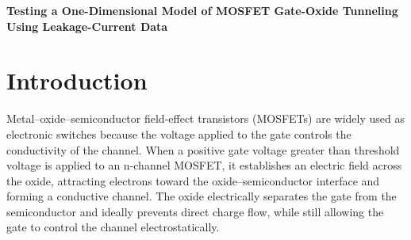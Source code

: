 \documentclass[12pt]{article}
\begin{document}
\begin{center}
    {\large\bfseries Testing a One-Dimensional Model of MOSFET Gate-Oxide Tunneling Using Leakage-Current Data}
\end{center}

\begin{abstract}
Gate leakage increases rapidly as the oxide barrier in a metal--oxide--semiconductor structure becomes thinner. This paper tests whether a one-dimensional trapezoidal barrier treated with the Wentzel--Kramers--Brillouin approximation captures the leading thickness and voltage dependence of measured gate-current density. The model predicts an approximately linear decrease of \(\ln|J_G|\) with oxide thickness and a decrease of the logarithmic decay coefficient as the oxide-voltage magnitude increases. Published data were independently digitized three times and analyzed by ordinary least-squares regression. For the Green dataset, the fitted decay coefficient was \(11.684~\mathrm{nm^{-1}}\) with \(R^2=0.9743\), corresponding to a tenfold decrease in current density for a thickness increase of \(0.197~\mathrm{nm}\). The residuals nevertheless indicate possible systematic curvature beyond the constant-slope approximation. A second analysis used four same-growth oxides reported by Khairurrijal et al. The fitted coefficient decreased from \(9.003\) to \(7.692~\mathrm{nm^{-1}}\) as \(\lvert V_{\mathrm{ox}}\rvert\) increased from \(1.0\) to \(2.5~\mathrm{V}\), and the normalized experimental ratios were numerically closer to the trapezoidal prediction than to a fixed rectangular-barrier prediction. The model therefore describes the leading experimental trends, but the comparison does not validate the absolute WKB exponent because the effective mass, barrier energies, and non-exponential current factors are not independently fixed across the devices.
\end{abstract}
\newpage
\section{Introduction}
Metal--oxide--semiconductor field-effect transistors (MOSFETs) are widely used as electronic switches because the voltage applied to the gate controls the conductivity of the channel. When a positive gate voltage greater than threshold voltage is applied to an n-channel MOSFET, it establishes an electric field across the oxide, attracting electrons toward the oxide--semiconductor interface and forming a conductive channel. The oxide electrically separates the gate from the semiconductor and ideally prevents direct charge flow, while still allowing the gate to control the channel electrostatically.
\end{document}
